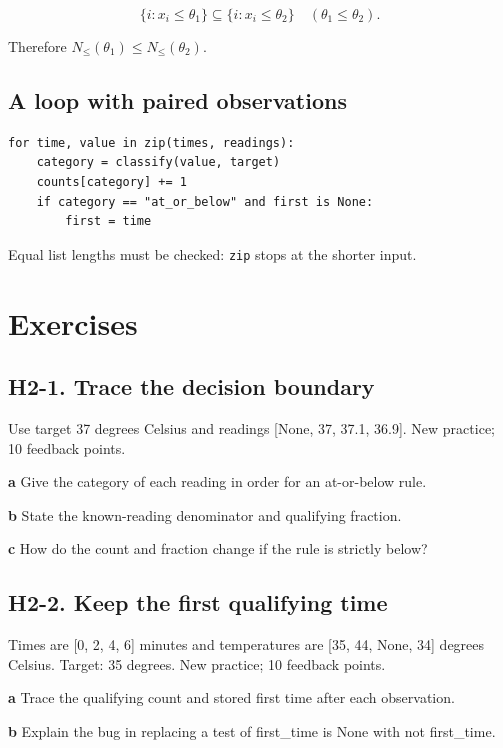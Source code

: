 \documentclass[11pt,letterpaper]{article}
\theoremstyle{definition}\newtheorem{definition}{Definition}\newtheorem{example}{Example}
\numberwithin{equation}{section}
\begin{document}
\[
\{i:x_i\leq\theta_1\}\subseteq\{i:x_i\leq\theta_2\}
\quad(\theta_1\leq\theta_2).
\]

Therefore $N_{\leq}(\theta_1)\leq N_{\leq}(\theta_2)$.

\subsection*{A loop with paired observations}
\begin{minipage}{\linewidth}
\begin{verbatim}
for time, value in zip(times, readings):
    category = classify(value, target)
    counts[category] += 1
    if category == "at_or_below" and first is None:
        first = time
\end{verbatim}
\end{minipage}
Equal list lengths must be checked: \texttt{zip} stops at the shorter input.
\bigskip
\section*{Exercises}
\par\noindent\begin{minipage}{\linewidth}
\subsection*{H2-1. Trace the decision boundary}
Use target 37 degrees Celsius and readings [None, 37, 37.1, 36.9]. New practice; 10 feedback points.

\textbf{a} Give the category of each reading in order for an at-or-below rule.

\end{minipage}\par\medskip
\textbf{b} State the known-reading denominator and qualifying fraction.

\textbf{c} How do the count and fraction change if the rule is strictly below?

\par\noindent\begin{minipage}{\linewidth}
\subsection*{H2-2. Keep the first qualifying time}
Times are [0, 2, 4, 6] minutes and temperatures are [35, 44, None, 34] degrees Celsius. Target: 35 degrees. New practice; 10 feedback points.

\textbf{a} Trace the qualifying count and stored first time after each observation.

\end{minipage}\par\medskip
\textbf{b} Explain the bug in replacing a test of first\_time is None with not first\_time.
\end{document}
